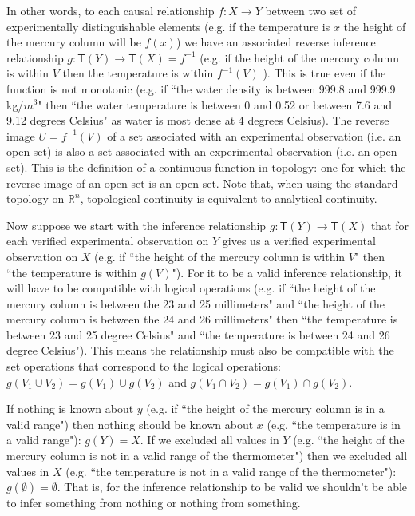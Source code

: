 \documentclass[11pt,letterpaper,fleqn]{memoir} %
\begin{document}
In other words, to each causal relationship $f: X \rightarrow Y$ between two set of experimentally distinguishable elements (e.g. if the temperature is $x$ the height of the mercury column will be $f(x)$) we have an associated reverse inference relationship $g  : \mathsf{T}(Y) \rightarrow \mathsf{T}(X) = f^{-1}$ (e.g. if the height of the mercury column is within $V$ then the temperature is within $f^{-1}(V)$ ). This is true even if the function is not monotonic (e.g. if ``the water density is between 999.8 and 999.9 kg/$m^3$" then ``the water temperature is between 0 and 0.52 or between 7.6 and 9.12 degrees Celsius" as water is most dense at 4 degrees Celsius).  The reverse image $U=f^{-1}(V)$ of a set associated with an experimental observation (i.e. an open set) is also a set associated with an experimental observation (i.e. an open set). This is the definition of a continuous function in topology: one for which the reverse image of an open set is an open set. Note that, when using the standard topology on $\mathbb{R}^n$, topological continuity is equivalent to analytical continuity.

Now suppose we start with the inference relationship $g  : \mathsf{T}(Y) \rightarrow \mathsf{T}(X)$ that for each verified experimental observation on $Y$ gives us a verified experimental observation on $X$ (e.g. if ``the height of the mercury column is within $V$" then ``the temperature is within $g(V)$"). For it to be a valid inference relationship, it will have to be compatible with logical operations (e.g. if ``the height of the mercury column is between the 23 and 25 millimeters" and ``the height of the mercury column is between the 24 and 26 millimeters" then ``the temperature is between 23 and 25 degree Celsius" and  ``the temperature is between 24 and 26 degree Celsius"). This means the relationship must also be compatible with the set operations that correspond to the logical operations: $g(V_1 \cup V_2)=g(V_1)\cup g(V_2)$ and $g(V_1 \cap V_2)=g(V_1)\cap g(V_2)$.

If nothing is known about $y$ (e.g. if ``the height of the mercury column is in a valid range") then nothing should be known about $x$ (e.g. ``the temperature is in a valid range"): $g(Y)=X$. If we excluded all values in $Y$ (e.g. ``the height of the mercury column is not in a valid range of the thermometer") then we excluded all values in $X$ (e.g. ``the temperature is not in a valid range of the thermometer"): $g(\emptyset) = \emptyset$. That is, for the inference relationship to be valid we shouldn't be able to infer something from nothing or nothing from something.
\end{document}
